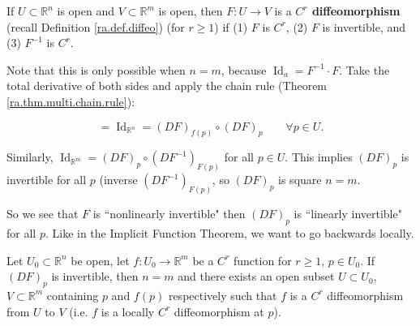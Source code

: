 \begin{definition}

If \(U \subset \mathbb{R}^n\) is open and \(V \subset \mathbb{R}^m\) is open, then \(F: U \to V\) is a \textbf{\(C^r\) diffeomorphism} (recall Definition \ref{ra.def.diffeo}) (for \(r \geq 1\)) if (1) \(F\) is \(C^r\), (2) \(F\) is invertible, and (3) \(F^{-1}\) is \(C^r\). 

\end{definition}
Note that this is only possible when \(n=m\), because \(\operatorname{Id}_a = F^{-1} \cdot F\). Take the total derivative of both sides and apply the chain rule (Theorem \ref{ra.thm.multi.chain.rule}):

\[
= \operatorname{Id}_{\mathbb{R}^n} = (DF)_{f(p)} \circ (DF)_p \qquad \forall p \in U.
\]

Similarly, \(\operatorname{Id}_{\mathbb{R}^m} = (DF)_p \circ (DF^{-1})_{F(p)} \) for all \(p \in U\). This implies \((DF)_p\) is invertible for all \(p\) (inverse \((DF^{-1})_{F(p)}\), so \((DF)_p\) is square \(n = m\).

So we see that \(F\) is ``nonlinearly invertible" then \((DF)_p\) is ``linearly invertible" for all \(p\). Like in the Implicit Function Theorem, we want to go backwards locally. 

\begin{theorem}

Let \(U_0 \subset \mathbb{R}^n\) be open, let \(f: U_0 \to \mathbb{R}^m\) be a \(C^r\) function for \(r \geq 1\), \(p \in U_0\). If \((DF)_p\) is invertible, then \(n = m\) and there exists  an open subset \(U \subset U_0\), \(V \subset \mathbb{R}^m\) containing \(p\) and \(f(p)\) respectively such that \(f\) is a \(C^r\) diffeomorphism from \(U\) to \(V\) (i.e. \(f\) is a locally \(C^r\) diffeomorphism at \(p\)).

\end{theorem}

